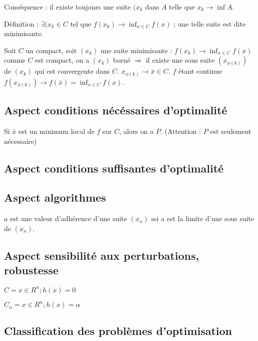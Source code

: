 	Conséquence : il existe toujours une suite $(x_k$ dans $A$ telle que $x_k \rightarrow \inf A$.
	
	Définition : $\exists (x_k \in C$ tel que $f(x_k) \rightarrow \inf_{x \in C} f(x)$ ; une telle suite est dite minimisante.
	
	Soit $C$ un compact, soit $(x_k)$ une suite minimisante : $f(x_k) \rightarrow \inf_{x \in C} f(x)$ comme $C$ est compact, on a $(x_k)$ borné $\Rightarrow$ il existe une sous suite $(x_{\phi(k)})$ de $(x_k)$ qui est convergente dans $C$. $x_{\phi(k)} \rightarrow \bar{x} \in C$. $f$ étant continue $f(x_{\phi(k)}) \rightarrow f(\bar{x}) = \inf_{x \in C} f(x)$.
	
	\subsection{Aspect \og conditions nécéssaires d'optimalité\fg}
	
	Si $\bar{x}$ est un minimum local de $f$ sur $C$, alors on a $P$. (Attention : $P$ est seulement nécessaire)
	
	\subsection{Aspect \og conditions suffisantes d'optimalité\fg}
	
	
	
	\subsection{Aspect \og algorithmes \fg}
	
	$a$ est une valeur d'adhérence d'une suite $(x_n)$ ssi a est la limite d'une sous suite de $(x_n)$.
	
	\subsection{Aspect \og sensibilité aux perturbations, robustesse \fg}
	
	$C = {x\in R^n ; h(x) = 0}$
	
	$C_\alpha = {x\in R^n ; h(x) = \alpha}$
	
	
	
	\subsection{Classification des problèmes d'optimisation}
	
